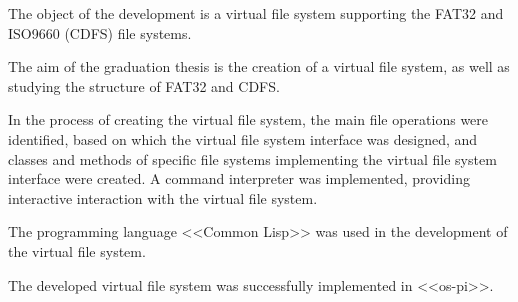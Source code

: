 The object of the development is a virtual file system supporting the FAT32 and ISO9660 (CDFS) file systems.

The aim of the graduation thesis is the creation of a virtual file system, as well as studying the structure of FAT32 and CDFS.

In the process of creating the virtual file system, the main file operations were identified, based on which the virtual file system interface was designed, and classes and methods of specific file systems implementing the virtual file system interface were created. A command interpreter was implemented, providing interactive interaction with the virtual file system.

The programming language <<Common Lisp>> was used in the development of the virtual file system.

The developed virtual file system was successfully implemented in <<os-pi>>.
